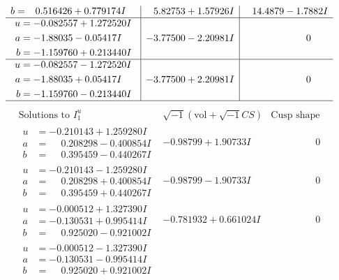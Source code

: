 \documentclass[1p]{elsarticle_modified}
\theoremstyle{definition}
\newcommand{\I}{\sqrt{-1}}
\begin{document}
$$\begin{array}{c|c|c}
\begin{aligned}
b &= \phantom{-}0.516426 + 0.779174 I\end{aligned}
 & \phantom{-}5.82753 + 1.57926 I & \phantom{-}14.4879 - 1.7882 I \\ \hline\begin{aligned}
u &= -0.082557 + 1.272520 I \\
a &= -1.88035 - 0.05417 I \\
b &= -1.159760 + 0.213440 I\end{aligned}
 & -3.77500 - 2.20981 I & \phantom{-0.000000 } 0 \\ \hline\begin{aligned}
u &= -0.082557 - 1.272520 I \\
a &= -1.88035 + 0.05417 I \\
b &= -1.159760 - 0.213440 I\end{aligned}
 & -3.77500 + 2.20981 I & \phantom{-0.000000 } 0\\
 \hline 
 \end{array}$$\newpage$$\begin{array}{c|c|c}  
\text{Solutions to }I^u_{1}& \I (\text{vol} + \sqrt{-1}CS) & \text{Cusp shape}\\
 \hline 
\begin{aligned}
u &= -0.210143 + 1.259280 I \\
a &= \phantom{-}0.208298 - 0.400854 I \\
b &= \phantom{-}0.395459 - 0.440267 I\end{aligned}
 & -0.98799 + 1.90733 I & \phantom{-0.000000 } 0 \\ \hline\begin{aligned}
u &= -0.210143 - 1.259280 I \\
a &= \phantom{-}0.208298 + 0.400854 I \\
b &= \phantom{-}0.395459 + 0.440267 I\end{aligned}
 & -0.98799 - 1.90733 I & \phantom{-0.000000 } 0 \\ \hline\begin{aligned}
u &= -0.000512 + 1.327390 I \\
a &= -0.130531 + 0.995414 I \\
b &= \phantom{-}0.925020 - 0.921002 I\end{aligned}
 & -0.781932 + 0.661024 I & \phantom{-0.000000 } 0 \\ \hline\begin{aligned}
u &= -0.000512 - 1.327390 I \\
a &= -0.130531 - 0.995414 I \\
b &= \phantom{-}0.925020 + 0.921002 I\end{aligned}

\end{array}$$
\end{document}
